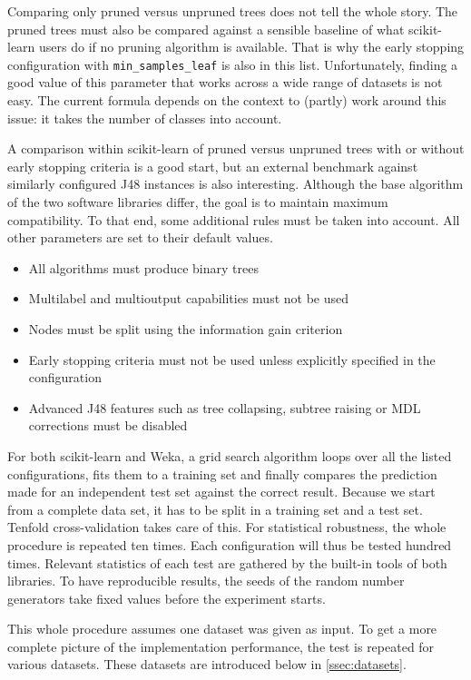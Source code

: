 Comparing only pruned versus unpruned trees does not tell the whole story. The pruned trees must also be compared against a sensible baseline of what scikit-learn users do if no pruning algorithm is available. That is why the early stopping configuration with \texttt{min\_samples\_leaf} is also in this list. Unfortunately, finding a good value of this parameter that works across a wide range of datasets is not easy. The current formula depends on the context to (partly) work around this issue: it takes the number of classes into account.

A comparison within scikit-learn of pruned versus unpruned trees with or without early stopping criteria is a good start, but an external benchmark against similarly configured J48 instances is also interesting. Although the base algorithm of the two software libraries differ, the goal is to maintain maximum compatibility. To that end, some additional rules must be taken into account. All other parameters are set to their default values.

\begin{itemize}
    \item All algorithms must produce binary trees
    \item Multilabel and multioutput capabilities must not be used
    \item Nodes must be split using the information gain criterion
    \item Early stopping criteria must not be used unless explicitly specified in the configuration
    \item Advanced J48 features such as tree collapsing, subtree raising or MDL corrections must be disabled
\end{itemize}

For both scikit-learn and Weka, a grid search algorithm loops over all the listed configurations, fits them to a training set and finally compares the prediction made for an independent test set against the correct result. Because we start from a complete data set, it has to be split in a training set and a test set. Tenfold cross-validation takes care of this. For statistical robustness, the whole procedure is repeated ten times. Each configuration will thus be tested hundred times. Relevant statistics of each test are gathered by the built-in tools of both libraries. To have reproducible results, the seeds of the random number generators take fixed values before the experiment starts.

This whole procedure assumes one dataset was given as input. To get a more complete picture of the implementation performance, the test is repeated for various datasets. These datasets are introduced below in \autoref{ssec:datasets}.

